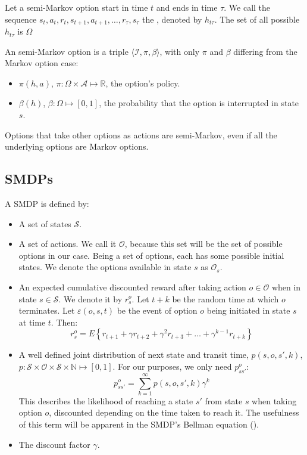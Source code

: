 Let a semi-Markov option start in time $t$ and ends in time $\tau$. We call the
sequence $s_t,a_t,r_t,s_{t+1},a_{t+1},\dots,r_\tau,s_\tau$ the
, denoted by $h_{t\tau}$. The set of all possible
$h_{t\tau}$ is $\Omega$

An semi-Markov option is a triple $\langle \mathcal{I}, \pi, \beta \rangle$,
with only $\pi$ and $\beta$ differing from the Markov option case:
\begin{itemize}
  \item $\pi(h, a)$, $\pi : \Omega \times \mathcal{A} \mapsto \mathbb{R}$,
the option's policy.
  \item $\beta(h)$, $\beta : \Omega \mapsto [0, 1]$, the probability that
the option is interrupted in state $s$.
\end{itemize}

Options that take other options as actions are semi-Markov, even if all the
underlying options are Markov options.

\subsection{\acfp{SMDP}}

A \ac{SMDP} is defined by:
\begin{itemize}
  \item A set of states $\mathcal{S}$.
  \item A set of actions. We call it $\mathcal{O}$, because this set will be the
    set of possible options in our case. Being a set of options, each has some
    possible initial states. We denote the options available in state $s$ as
$\mathcal{O}_s$.
  \item An expected cumulative discounted reward after taking action $o \in
    \mathcal{O}$ when in state $s \in \mathcal{S}$. We denote it by $r^o_s$. Let
    $t+k$ be the random time at which $o$ terminates. Let $\varepsilon(o, s, t)$
    be the event of option $o$ being initiated in state $s$ at time $t$. Then:
    \begin{equation}
      r^o_s = E\left\{ r_{t+1} + \gamma r_{t+2} + \gamma^2 r_{t+3} + \dots
      + \gamma^{k-1} r_{t+k} \right\}
    \end{equation}
  \item A well defined joint distribution of next state and transit time, $p(s,
    o, s', k)$, $p : \mathcal{S} \times \mathcal{O} \times \mathcal{S} \times
    \mathbb{N} \mapsto [0, 1]$. For our purposes, we only need $p^o_{ss'}$:
    \begin{equation}
      p^o_{ss'} = \sum_{k=1}^\infty p(s, o, s', k) \gamma^k
    \end{equation}
    This describes the likelihood of reaching a state $s'$ from state $s$ when
    taking option $o$, discounted depending on the time taken to reach it. The
    usefulness of this term will be apparent in the \ac{SMDP}'s Bellman equation
  ().
  \item The discount factor $\gamma$.
\end{itemize}

